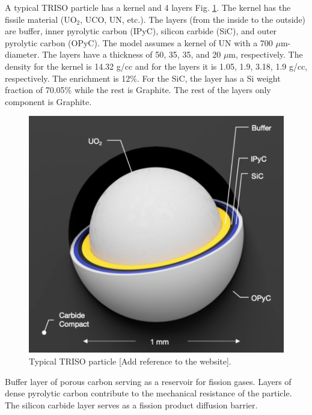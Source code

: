 A typical TRISO particle has a kernel and 4 layers Fig. \ref{fig:triso}. The kernel has the fissile material (UO$_2$, UCO, UN, etc.). The layers (from the inside to the outside) are buffer, inner pyrolytic carbon (IPyC), silicon carbide (SiC), and outer pyrolytic carbon (OPyC).
The model assumes a kernel of UN with a 700 $\mu$m-diameter. The layers have a thickness of 50, 35, 35, and 20 $\mu$m, respectively.
The density for the kernel is 14.32 g/cc and for the layers it is 1.05, 1.9, 3.18, 1.9 g/cc, respectively. The enrichment is 12\%. For the SiC, the layer has a Si weight fraction of 70.05\% while the rest is Graphite. The rest of the layers only component is Graphite.

\begin{figure}[H]
	\centering
	\includegraphics[width=0.5\linewidth]{figures/triso1.png}
	\hfill
	\caption{Typical TRISO particle [Add reference to the website].}
	\label{fig:triso}
\end{figure}

Buffer layer of porous carbon serving as a reservoir for fission gases.
Layers of dense pyrolytic carbon contribute to the mechanical resistance of the particle.
The silicon carbide layer serves as a fission product diffusion barrier.
\cite{france_gas-cooled_2006}